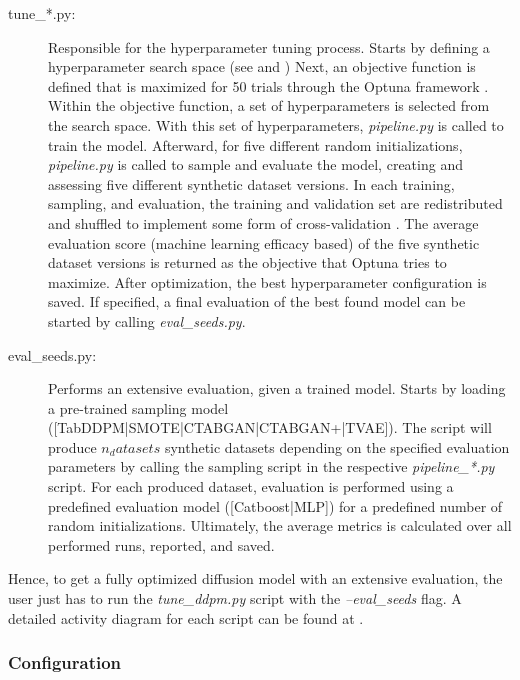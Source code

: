 \begin{description}
    \item[tune\_*.py\footnotemark:]
    Responsible for the hyperparameter tuning process.
    Starts by defining a hyperparameter search space (see \cite[Table 1, p. 4]{kotelnikov2022TabDDPMModellingTabular} and \cite[Table 7-11, p. 13 f.]{kotelnikov2022TabDDPMModellingTabular})
    Next, an objective function is defined that is maximized for 50 trials through the Optuna framework \cite{optuna_2019}.
    Within the objective function, a set of hyperparameters is selected from the search space.
    With this set of hyperparameters, \textit{pipeline.py} is called to train the model.
    Afterward, for five different random initializations, \textit{pipeline.py} is called to sample and evaluate the model, creating and assessing five different synthetic dataset versions.
    In each training, sampling, and evaluation, the training and validation set are redistributed and shuffled to implement some form of cross-validation \cite{kohavi2001StudyCrossValidationBootstrap}.
    The average evaluation score (machine learning efficacy based) of the five synthetic dataset versions is returned as the objective that Optuna tries to maximize.
    After optimization, the best hyperparameter configuration is saved.
    If specified, a final evaluation of the best found model can be started by calling \textit{eval\_seeds.py}.
    \item[eval\_seeds.py:]
    Performs an extensive evaluation, given a trained model.
    Starts by loading a pre-trained sampling model ([TabDDPM|SMOTE|CTABGAN|CTABGAN+|TVAE]).
    The script will produce $n_datasets$ synthetic datasets depending on the specified evaluation parameters by calling the sampling script in the respective \textit{pipeline\_*.py} script.
    For each produced dataset, evaluation is performed using a predefined evaluation model ([Catboost|MLP]) for a predefined number of random initializations.
    Ultimately, the average metrics is calculated over all performed runs, reported, and saved.
\end{description}

Hence, to get a fully optimized diffusion model with an extensive evaluation, the user just has to run the \textit{tune\_ddpm.py} script with the \textit{--eval\_seeds} flag.
A detailed activity diagram for each script can be found at .

\subsubsection[]{Configuration}

